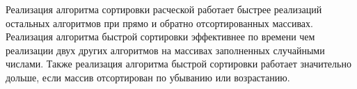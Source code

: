 Реализация алгоритма сортировки расческой работает быстрее реализаций остальных алгоритмов при прямо и обратно отсортированных массивах.
Реализация алгоритма быстрой сортировки эффективнее по времени чем реализации двух других алгоритмов на массивах заполненных случайными числами.
Также реализация алгоритма быстрой сортировки работает значительно дольше, если массив отсортирован по убыванию или возрастанию.

